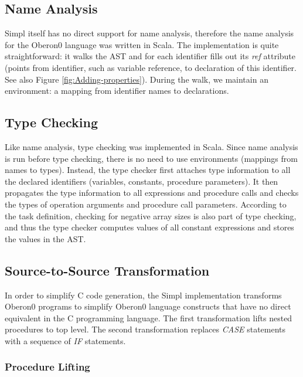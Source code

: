 \subsection{Name Analysis}

Simpl itself has no direct support for name analysis, therefore the
name analysis for the Oberon0 language was written in Scala. The implementation
is quite straightforward: it walks the AST and for each identifier
fills out its \emph{ref} attribute (points from identifier, such as
variable reference, to declaration of this identifier. See also Figure
\ref{fig:Adding-properties}). During the walk, we maintain an environment:
a mapping from identifier names to declarations.






\subsection{Type Checking}

Like name analysis, type checking was implemented in Scala. Since
name analysis is run before type checking, there is no need to use
environments (mappings from names to types). Instead, the type checker
first attaches type information to all the declared identifiers (variables,
constants, procedure parameters). It then propagates the type information
to all expressions and procedure calls and checks the types of operation
arguments and procedure call parameters.  According to the task definition,
checking for negative array sizes is also part of type checking, and
thus the type checker computes values of all constant expressions
and stores the values in the AST.




\subsection{Source-to-Source Transformation}

In order to simplify C code generation, the Simpl implementation transforms
Oberon0 programs to simplify Oberon0 language constructs that have
no direct equivalent in the C programming language. The first transformation
lifts nested procedures to top level. The second transformation replaces
\emph{CASE} statements with a sequence of \emph{IF} statements.


\subsubsection{\label{sub:Procedure-Lifting}Procedure Lifting}

